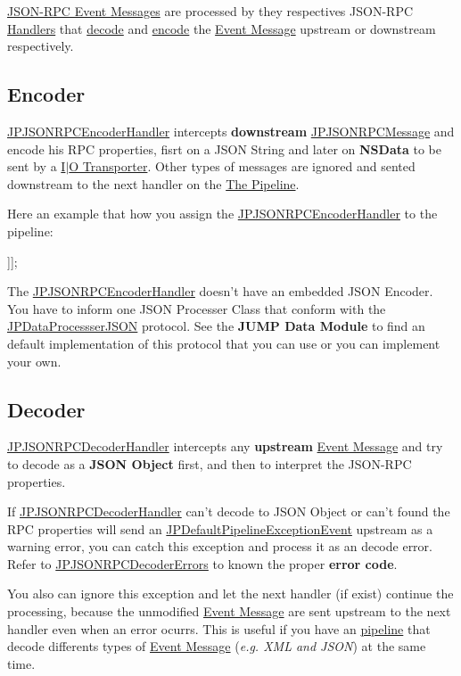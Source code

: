 \hyperlink{a00008}{JSON-\/RPC Event Messages} are processed by they respectives JSON-\/RPC \hyperlink{a00003}{Handlers} that \hyperlink{a00015}{decode} and \hyperlink{a00016}{encode} the \hyperlink{a00006}{Event Message} upstream or downstream respectively.

\subsection*{Encoder}

\hyperlink{a00016}{JPJSONRPCEncoderHandler} intercepts {\bfseries downstream} \hyperlink{a00018}{JPJSONRPCMessage} and encode his RPC properties, fisrt on a JSON String and later on {\bfseries NSData} to be sent by a \hyperlink{a00002}{I$|$O Transporter}. Other types of messages are ignored and sented downstream to the next handler on the \hyperlink{a00001}{The Pipeline}. 

Here an example that how you assign the \hyperlink{a00016}{JPJSONRPCEncoderHandler} to the pipeline: 
\begin{DoxyCode}
 [pipeline addLast:@"JSONRPCEncoder" withHandler:[JPJSONRPCEncoderHandler initWit
      hJSONEncoderClass:[JSONEncoder class]]];
\end{DoxyCode}
 The \hyperlink{a00016}{JPJSONRPCEncoderHandler} doesn't have an embedded JSON Encoder. You have to inform one JSON Processer Class that conform with the \hyperlink{a00009}{JPDataProcessserJSON} protocol. See the {\bfseries JUMP Data Module} to find an default implementation of this protocol that you can use or you can implement your own. 

\subsection*{Decoder}

\hyperlink{a00015}{JPJSONRPCDecoderHandler} intercepts any {\bfseries upstream} \hyperlink{a00006}{Event Message} and try to decode as a {\bfseries JSON Object} first, and then to interpret the JSON-\/RPC properties. 

If \hyperlink{a00015}{JPJSONRPCDecoderHandler} can't decode to JSON Object or can't found the RPC properties will send an \hyperlink{a00013}{JPDefaultPipelineExceptionEvent} upstream as a warning error, you can catch this exception and process it as an decode error. Refer to \hyperlink{a00015_aba2b766c1b7742f5c636bbbd578df618}{JPJSONRPCDecoderErrors} to known the proper {\bfseries error code}. 

You also can ignore this exception and let the next handler (if exist) continue the processing, because the unmodified \hyperlink{a00006}{Event Message} are sent upstream to the next handler even when an error ocurrs. This is useful if you have an \hyperlink{a00001}{pipeline} that decode differents types of \hyperlink{a00006}{Event Message} ({\itshape e.g. XML and JSON\/}) at the same time. 

